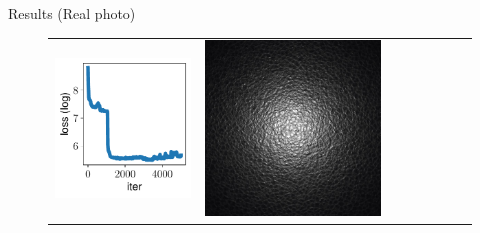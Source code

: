 \documentclass[final]{beamer}
\newlength{\twocolwid}
\newlength{\resultwidth}
\begin{document}
\begin{frame}[t]
\begin{columns}[t]
\begin{column}{\twocolwid}
\begin{block}{Results (Real photo)}
\begin{figure}[t]
\begin{tabular}{ccrclccc}
            		\includegraphics[width=\resultwidth]{real/leather/loss.pdf} &
            		\includegraphics[width=\resultwidth]{real/leather/optim.jpg} &

\end{tabular}
\end{figure}
\end{block}
\end{column}
\end{columns}
\end{frame}
\end{document}

